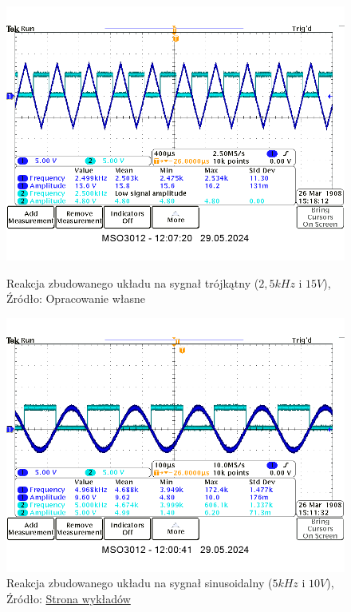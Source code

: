 \documentclass{article}
\begin{document}
        \begin{figure}[!ht]
          \begin{minipage}{.5\textwidth}
            \centering
            \includegraphics[scale=0.35]{grafiki/komparator_2.5kHz_15V_ramp.png}
            \caption{Reakcja zbudowanego układu na sygnał trójkątny ($2,5kHz$ i $15V$),
            \\Źródło: Opracowanie własne}
          \end{minipage}
          \begin{minipage}{.5\textwidth}
            \centering
            \includegraphics[scale=0.35]{grafiki/komparator_5kHz_10V_sin.png}
            \caption{Reakcja zbudowanego układu na sygnał sinusoidalny ($5kHz$ i $10V$),
            \\Źródło: \href{https://spe.if.uj.edu.pl/instrukcje}{Strona wykładów}}
          \end{minipage}
        \end{figure}
\end{document}
